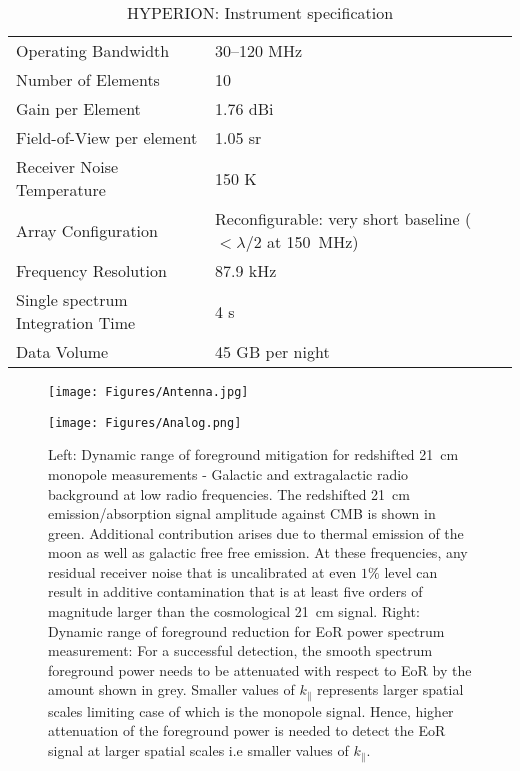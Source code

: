 \documentclass[12pt]{amsart}
\begin{document}
\begin{table}[htb]
\caption{ HYPERION: Instrument specification}
\begin{tabular}{l|l}
\hline\hline
Operating Bandwidth & 30--120 MHz \\
Number of Elements & 10 \\
Gain per Element & 1.76 dBi \\
Field-of-View per element & 1.05 sr \\
Receiver Noise Temperature & 150 K \\
Array Configuration & Reconfigurable: very short baseline ($<\lambda/2$ at 150~MHz)\\
Frequency Resolution & 87.9 kHz\\
Single spectrum Integration Time & 4 s\\
Data Volume & 45 GB per night \\
\hline
\end{tabular}
\label{tab:features}
\end{table}

 \begin{figure}
 \begin{minipage}[b]{0.45\linewidth}
\centering
\texttt{[image: Figures/Antenna.jpg]}
\end{minipage}
 \begin{minipage}[b]{0.45\linewidth}
\centering
\texttt{[image: Figures/Analog.png]}
\end{minipage}
\caption{\footnotesize{Left: Dynamic range of foreground mitigation for redshifted 21~cm monopole measurements - Galactic and extragalactic radio background at low radio frequencies. The redshifted 21~cm emission/absorption signal amplitude against CMB is shown in green. Additional contribution arises due to thermal emission of the moon as well as galactic free free emission. At these frequencies, any residual receiver noise that is uncalibrated at even $1\%$ level can result in additive contamination that is at least five orders of magnitude larger than the cosmological 21~cm signal. Right: Dynamic range of foreground reduction for EoR power spectrum measurement: For a successful detection, the smooth spectrum foreground power needs to be attenuated with respect to EoR by the amount shown in grey. Smaller values of $k_{\parallel}$ represents larger spatial scales limiting case of which is the monopole signal. Hence, higher attenuation of the foreground power is needed to detect the EoR signal at larger spatial scales i.e smaller values of $k_{\parallel}$.}}
\label{Fig:6}
\end{figure} 
\end{document}
